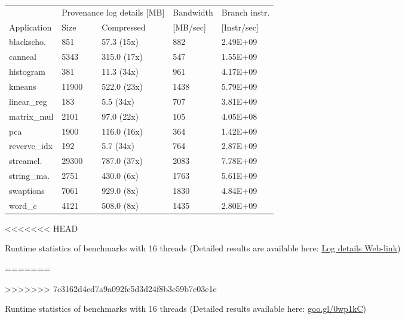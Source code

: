 \begin{figure}[t]
\centering
\myfontsize
{
\begin{tabular}{m{1cm}|m{1cm}|m{1.4cm}|m{1.25cm}|m{1.25cm}}
       & \multicolumn{2}{c|}{ Provenance log details [MB] }   &  Bandwidth & Branch instr. \\
   { Application} & Size & Compressed & [MB/sec] &  [Instr/sec] \\
  \hline \hline
    blackscho.& 851& 57.3 (15x)& 882& 2.49E+09 \\
    canneal& 5343& 315.0 (17x)& 547& 1.55E+09 \\
    histogram& 381& 11.3 (34x)& 961& 4.17E+09 \\
    kmeans& 11900& 522.0 (23x)& 1438& 5.79E+09 \\
    linear\_reg& 183& 5.5 (34x)& 707& 3.81E+09 \\
    matrix\_mul& 2101& 97.0 (22x)& 105& 4.05E+08 \\
    pca& 1900& 116.0 (16x)& 364& 1.42E+09 \\
    reverve\_idx& 192& 5.7 (34x)& 764& 2.87E+09 \\
    streamcl.& 29300& 787.0 (37x)& 2083& 7.78E+09 \\
    string\_ma.& 2751& 430.0 (6x)& 1763& 5.61E+09 \\
    swaptions& 7061& 929.0 (8x)& 1830& 4.84E+09 \\
    word\_c& 4121& 508.0 (8x)& 1435& 2.80E+09 \\

\hline
\end{tabular}
}

<<<<<<< HEAD
\caption{Runtime statistics of benchmarks with 16 threads (Detailed results are available here: \href{https://dl.dropboxusercontent.com/content_link/jLbyMtTMs1bZnBUGPsn8vidcUdrtSZ2TZI5ASfHy4VgG1Ey7Nmm9hT8Qe6gUaIes/file\#measurement_table}{Log details Web-link}) }                                                                                                                                      \label{tab:apps}
=======
\caption{Runtime statistics of benchmarks with 16 threads (Detailed results available here: \href{https://goo.gl/0wp1kC}{goo.gl/0wp1kC}) }                                                                                                                                      \label{tab:apps}
>>>>>>> 7c3162d4cd7a9a092fc5d3d24f8b3c59b7c03e1e
\end{figure}

